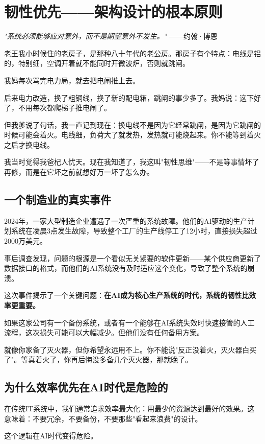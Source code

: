 \chapter{韧性优先——架构设计的根本原则}


\textit{"系统必须能够应对意外，而不是期望意外不发生。"}
——约翰·博恩


老王我小时候住的老房子，是那种八十年代的老公房。那房子有个特点：电线是铝的，特别细，空调开着就不能同时开微波炉，否则就跳闸。

我妈每次骂完电力局，就去把电闸推上去。

后来电力改造，换了粗铜线，换了新的配电箱，跳闸的事少多了。我妈说：这下好了，不用每次都爬梯子推电闸了。

但我爹说了句话，我一直记到现在：换电线不是因为它经常跳闸，是因为它跳闸的时候可能会着火。电线细，负荷大了就发热，发热就可能烧起来。你不能等到着火之后才换电线。

我当时觉得我爸杞人忧天。现在我知道了，我这叫"韧性思维"——不是等事情坏了再修，而是在它坏之前就想好万一坏了怎么办。

\section{一个制造业的真实事件}


2024年，一家大型制造企业遭遇了一次严重的系统故障。他们的AI驱动的生产计划系统在凌晨3点发生故障，导致整个工厂的生产线停工了12小时，直接损失超过2000万美元。

事后调查发现，问题的根源是一个看似无关紧要的软件更新——某个供应商更新了数据接口的格式，而他们的AI系统没有及时适应这个变化，导致了整个系统的崩溃。

这次事件揭示了一个关键问题：\textbf{在AI成为核心生产系统的时代，系统的韧性比效率更重要。}

如果这家公司有一个备份系统，或者有一个能够在AI系统失效时快速接管的人工流程，这次损失可能可以大幅减少。但他们没有任何备用方案。

就像你家备了灭火器，但你希望永远用不上。你不能说"反正没着火，灭火器白买了"。等真着火了，你再后悔没多备几个灭火器，那就晚了。

\section{为什么效率优先在AI时代是危险的}


在传统IT系统中，我们通常追求效率最大化：用最少的资源达到最好的效果。这意味着：不要冗余，不要备份，不要那些"看起来浪费"的设计。

这个逻辑在AI时代变得危险。

